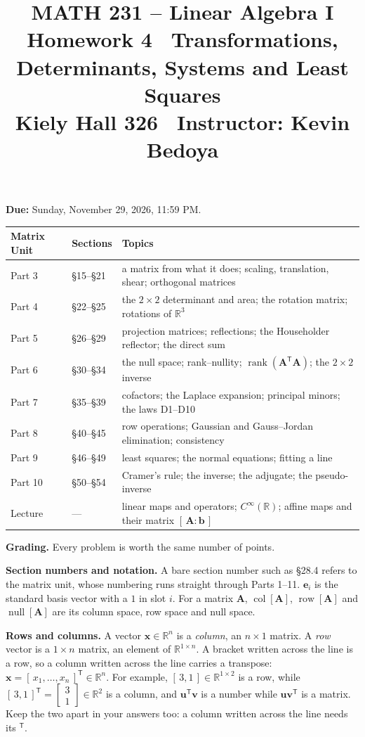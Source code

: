 \documentclass[11pt]{article}
\title{\vspace{-1.2cm}\textbf{\sffamily MATH 231 -- Linear Algebra I}\\[4pt]
       {\large\sffamily Homework 4 \textbullet\ Transformations, Determinants,
        Systems and Least Squares}\\[2pt]
       {\normalsize\sffamily Kiely Hall 326 \textbullet\
        Instructor: Kevin Bedoya}}
\author{}
\date{}
\newcounter{prob}[section]
\newcommand{\R}{\mathbb{R}}
\newcommand{\vc}[1]{\mathbf{#1}}
\newcommand{\mt}[1]{\mathbf{#1}}          %
\newcommand{\T}{^{\mathsf{T}}}            %
\newcommand{\colsp}[1]{\operatorname{col}[#1]}
\newcommand{\rowsp}[1]{\operatorname{row}[#1]}
\newcommand{\nullsp}[1]{\operatorname{null}[#1]}
\DeclareMathOperator{\rank}{rank}
\newcommand{\duedate}{Sunday, November 29, 2026, 11:59 PM}
\begin{document}
\maketitle
\vspace{-1.6cm}

\noindent\textbf{Due:} \duedate.

\medskip
\begin{center}
\small
\renewcommand{\arraystretch}{1.08}
\begin{tabular}{@{}l l >{\raggedright\arraybackslash}p{12cm}@{}}
\toprule
\textbf{Matrix Unit} & \textbf{Sections} & \textbf{Topics} \\
\midrule
Part 3 & \S15--\S21 & a matrix from what it does; scaling, translation, shear; orthogonal matrices \\
Part 4 & \S22--\S25 & the $2\times2$ determinant and area; the rotation matrix; rotations of $\R^{3}$ \\
Part 5 & \S26--\S29 & projection matrices; reflections; the Householder reflector; the direct sum \\
Part 6 & \S30--\S34 & the null space; rank--nullity; $\rank(\mt{A}\T\mt{A})$; the $2\times2$ inverse \\
Part 7 & \S35--\S39 & cofactors; the Laplace expansion; principal minors; the laws D1--D10 \\
Part 8 & \S40--\S45 & row operations; Gaussian and Gauss--Jordan elimination; consistency \\
Part 9 & \S46--\S49 & least squares; the normal equations; fitting a line \\
Part 10 & \S50--\S54 & Cramer's rule; the inverse; the adjugate; the pseudo-inverse \\
Lecture & --- & linear maps and operators; $C^{\infty}(\R)$; affine maps and their matrix $[\,\mt{A}:\vc{b}\,]$ \\
\bottomrule
\end{tabular}
\end{center}

\noindent\textbf{Grading.} Every problem is worth the same number of points.

\smallskip
\noindent\textbf{Section numbers and notation.} A bare section number such as
\S28.4 refers to the matrix unit, whose numbering runs straight through
Parts 1--11. $\vc{e}_i$ is the standard basis vector with a $1$ in slot $i$.
For a matrix $\mt{A}$, $\colsp{\mt{A}}$, $\rowsp{\mt{A}}$ and $\nullsp{\mt{A}}$
are its column space, row space and null space.

\smallskip
\noindent\textbf{Rows and columns.} A vector $\vc{x}\in\R^{n}$ is a
\emph{column}, an $n\times1$ matrix. A \emph{row} vector is a $1\times n$
matrix, an element of $\R^{1\times n}$. A bracket written across the line is a
row, so a column written across the line carries a transpose:
$\vc{x}=[\,x_1,\dots,x_n\,]\T\in\R^{n}$. For example,
$[\,3,1\,]\in\R^{1\times2}$ is a row, while
$[\,3,1\,]\T=\left[\begin{smallmatrix}3\\1\end{smallmatrix}\right]\in\R^{2}$
is a column, and $\vc{u}\T\vc{v}$ is a number while $\vc{u}\vc{v}\T$ is a
matrix. Keep the two apart in your answers too: a column written across the
line needs its $\T$.
\end{document}
